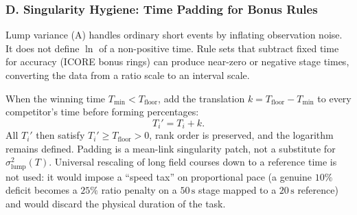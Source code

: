 \documentclass[12pt]{article}
\newcommand{\slump}{\sigma_{\mathrm{lump}}^2}  %
\newcommand{\tfloor}{T_{\mathrm{floor}}}
\newcommand{\tmin}{T_{\mathrm{min}}}
\begin{document}
	\subsubsection*{D. Singularity Hygiene: Time Padding for Bonus Rules}
	\label{sec:padding}
	Lump variance (A) handles ordinary short events by inflating observation noise. It does not define $\ln$ of a non-positive time. Rule sets that subtract fixed time for accuracy (ICORE bonus rings) can produce near-zero or negative stage times, converting the data from a ratio scale to an interval scale.
	
	When the winning time $\tmin < \tfloor$, add the translation $k = \tfloor - \tmin$ to every competitor's time before forming percentages:
	\begin{equation}
		T_i' = T_i + k.
	\end{equation}
	All $T_i'$ then satisfy $T_i' \ge \tfloor > 0$, rank order is preserved, and the logarithm remains defined. Padding is a mean-link singularity patch, not a substitute for $\slump(T)$. Universal rescaling of long field courses down to a reference time is not used: it would impose a ``speed tax'' on proportional pace (a genuine $10\%$ deficit becomes a $25\%$ ratio penalty on a $50\,\mathrm{s}$ stage mapped to a $20\,\mathrm{s}$ reference) and would discard the physical duration of the task.
	
\end{document}
